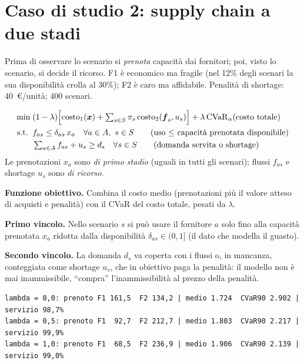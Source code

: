 \section{Caso di studio 2: supply chain a due stadi}

Prima di osservare lo scenario si \emph{prenota} capacità dai fornitori; poi, visto
lo scenario, si decide il ricorso. F1 è economico ma fragile (nel 12\% degli scenari
la sua disponibilità crolla al 30\%); F2 è caro ma affidabile. Penalità di shortage:
40~\euro/unità; 400 scenari.

\begin{modello}
\begin{align*}
\min\;& (1-\lambda) \Bigl[\text{costo}_1(\boldsymbol{x}) + \textstyle\sum_{s \in S} \pi_s\,
        \text{costo}_2(\boldsymbol{f}_s, u_s)\Bigr] + \lambda\, \mathrm{CVaR}_\alpha(\text{costo totale}) \\
\text{s.t.}\;\; & f_{as} \le \delta_{as}\, x_a \quad \forall a \in A,\ s \in S
   \qquad\text{(uso $\le$ capacità prenotata disponibile)} \\
& \textstyle\sum_{a \in A} f_{as} + u_s \ge d_s \quad \forall s \in S
   \qquad\text{(domanda servita o shortage)}
\end{align*}
Le prenotazioni $x_a$ sono \emph{di primo stadio} (uguali in tutti gli scenari);
flussi $f_{as}$ e shortage $u_s$ sono \emph{di ricorso}.
\end{modello}

\begin{spiegazione}
\textbf{Funzione obiettivo.} Combina il costo medio (prenotazioni più il valore
atteso di acquisti e penalità) con il CVaR del costo totale, pesati da $\lambda$.

\textbf{Primo vincolo.} Nello scenario $s$ si può usare il fornitore $a$ solo fino
alla capacità prenotata $x_a$ ridotta dalla disponibilità $\delta_{as} \in (0, 1]$
(il dato che modella il guasto).

\textbf{Secondo vincolo.} La domanda $d_s$ va coperta con i flussi o, in mancanza,
conteggiata come shortage $u_s$, che in obiettivo paga la penalità: il modello non è
mai inammissibile, ``compra'' l'inammissibilità al prezzo della penalità.
\end{spiegazione}

\begin{lstlisting}[style=output]
lambda = 0,0: prenoto F1 161,5  F2 134,2 | medio 1.724  CVaR90 2.902 | servizio 98,7%
lambda = 0,5: prenoto F1  92,7  F2 212,7 | medio 1.803  CVaR90 2.217 | servizio 99,9%
lambda = 1,0: prenoto F1  68,5  F2 236,9 | medio 1.906  CVaR90 2.139 | servizio 99,0%
\end{lstlisting}

